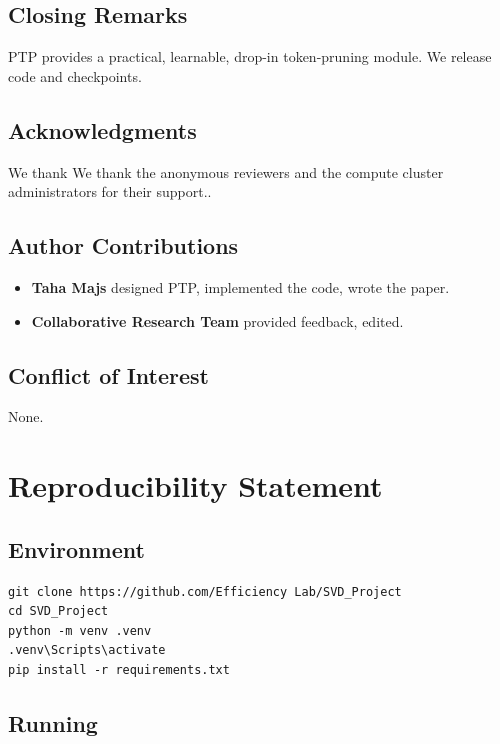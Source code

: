 {\begin{itemize}
\end{itemize}
\subsection{Closing Remarks}

PTP provides a practical, learnable, drop-in token-pruning module. We 
release code and checkpoints.

\subsection{Acknowledgments}

We thank We thank the anonymous reviewers and the compute cluster administrators for their support..

\subsection{Author Contributions}

\begin{itemize}
\item \textbf{Taha Majs} designed PTP, implemented the code, wrote the paper.
\item \textbf{Collaborative Research Team} provided feedback, edited.

\end{itemize}
\subsection{Conflict of Interest}

None.




\section{Reproducibility Statement}

\subsection{Environment}

\begin{lstlisting}
git clone https://github.com/Efficiency Lab/SVD_Project
cd SVD_Project
python -m venv .venv
.venv\Scripts\activate
pip install -r requirements.txt
\end{lstlisting}

\subsection{Running}

}
